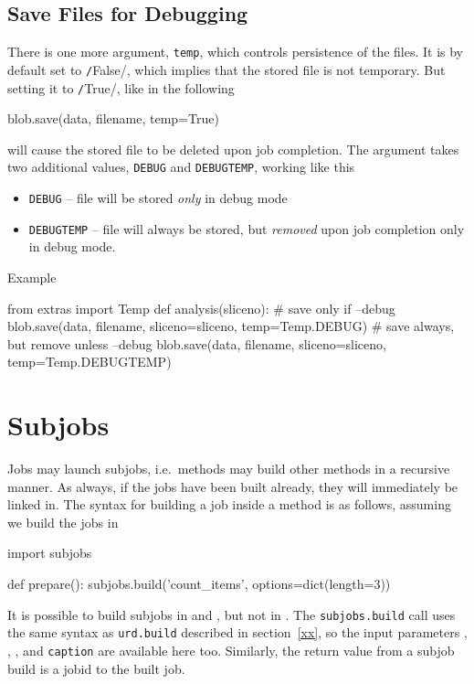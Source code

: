 \subsection*{Save Files for Debugging}
There is one more argument, \texttt{temp}, which controls persistence
of the files.  It is by default set to \texttt/False/,
which implies that the stored file is not temporary.  But setting it
to \texttt/True/, like in the following
\begin{python}
    blob.save(data, filename, temp=True)
\end{python}
will cause the stored file to be deleted upon job completion.  The
argument takes two additional values, \texttt{DEBUG} and
\texttt{DEBUGTEMP}, working like this
\begin{itemize}
\item[] \texttt{DEBUG} -- file will be stored \emph{only} in debug
  mode
\item[] \texttt{DEBUGTEMP} -- file will always be stored, but
  \emph{removed} upon job completion only in debug mode.
\end{itemize}
Example
\begin{python}
from extras import Temp
def analysis(sliceno):
  # save only if --debug
  blob.save(data, filename, sliceno=sliceno, temp=Temp.DEBUG)
  # save always, but remove unless --debug
  blob.save(data, filename, sliceno=sliceno, temp=Temp.DEBUGTEMP)
\end{python}


\clearpage
\section{Subjobs}

Jobs may launch subjobs, i.e.\ methods may build other methods in a
recursive manner.  As always, if the jobs have been built already,
they will immediately be linked in.  The syntax for building a job
inside a method is as follows, assuming we build the jobs in \prepare
\begin{python}
import subjobs

def prepare():
  subjobs.build('count_items', options=dict(length=3))
\end{python}
It is possible to build subjobs in \prepare and \synthesis, but not in
\analysis.    The \texttt{subjobs.build} call uses the
same syntax as \texttt{urd.build} described in section~\ref{xx}, so
the input parameters \options, \datasets, \jobids, and
\texttt{caption} are available here too.  Similarly, the return value
from a subjob build is a jobid to the built job.

